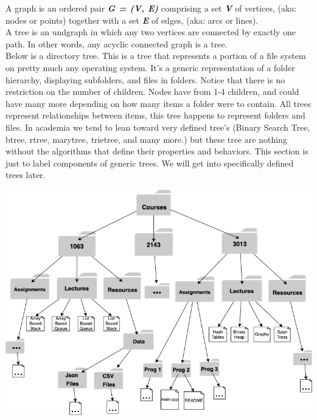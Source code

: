 \newpage
{}

A graph is an ordered pair \textbf{\emph{G = (V, E)}} comprising a set \textbf{\emph{V}} of vertices, (aka: nodes or points) together with a set \textbf{\emph{E}} of edges, (aka: arcs or lines).\\

A tree is an \gls{undgraph} in which any two vertices are connected by exactly one path. In other words, any \gls{acyclic} connected graph is a tree.\\

Below is a directory tree. This is a tree that represents a portion of a file system on pretty much any operating system. It's a generic representation of a folder hierarchy, displaying subfolders, and files in folders. Notice that there is no restriction on the number of children. Nodes have from 1-4 children, and could have many more depending on how many items a folder were to contain. All trees represent relationships between items, this tree happens to represent folders and files. In academia we tend to lean toward very defined tree's (Binary Search Tree, \gls{btree}, \gls{rtree}, \gls{marytree}, \gls{trietree}, and many more.) but these tree are nothing without the algorithms that define their properties and behaviors. This section is just to label components of generic trees. We will get into specifically defined trees later. 


\begin{center}
	\includegraphics[scale=.45]{images/directory_structure_tree.png}
\end{center}

